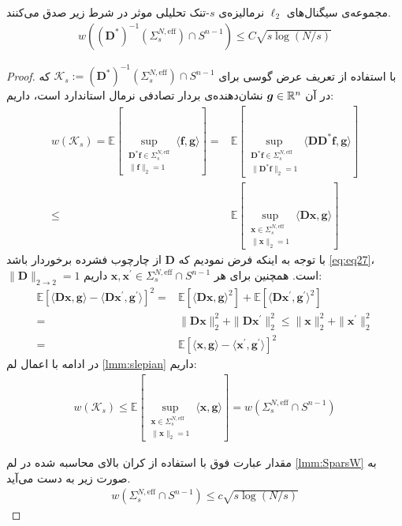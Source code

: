 \begin{lemma}
\label{lmm:PreImW}
مجموعه‌ی سیگنال‌های 
$\ell_2$
نرمالیزه‌ی 
$s$-تنک
تحلیلی موثر در شرط زیر صدق می‌کنند.
\begin{align}
\label{eq:PreImW1}
\mathit{w}\left(\left(\mathbf{D}^{\ast}\right)^{-1}\left(\Sigma_{s}^{N,\text{eff}}\right)\cap S^{n-1} \right)\leq C \sqrt{s \log\left(N/s\right)}
\end{align}
\end{lemma}


\begin{proof}
با استفاده از تعریف عرض گوسی برای
$ \mathcal{K}_{s}:= \left(\mathbf{D}^{\ast}\right)^{-1}\left(\Sigma_{s}^{N,\text{eff}}\right)\cap S^{n-1} $
که در آن 
$ \bm{g}\in \mathbb{R}^{n} $
نشان‌دهنده‌ی  بردار تصادفی نرمال استاندارد است، داریم:
\begin{align*}
\mathit{w}\left(\mathcal{K}_{s}\right)= \mathbb{E}\left[\sup_{\substack{\bm{D}^{\ast}\bm{f}\in \Sigma_{s}^{N,\text{eff}}\\ \|\bm{f}\|_2=1}} \langle\bm{f},\bm{g}\rangle \right] 
=& \mathbb{E}\left[\sup_{\substack{\bm{D}^{\ast}\bm{f}\in \Sigma_{s}^{N,\text{eff}}\\ \|\bm{D}^{\ast}\bm{f}\|_2=1}} \langle\bm{D}\bm{D}^{\ast}\bm{f},\bm{g}\rangle \right] \\
\leq & \mathbb{E}\left[\sup_{\substack{\bm{x}\in \Sigma_{s}^{N,\text{eff}}\\ \|\bm{x}\|_2=1}} \langle\bm{D}\bm{x},\bm{g}\rangle \right] 
\end{align*}
با توجه به اینکه فرض نمودیم که 
$\bm{D}$
از چارچوب فشرده برخوردار باشد
\eqref{eq:eq27}، 
$ \|\bm{D}\|_{2\rightarrow 2} = 1 $
است. همچنین برای هر 
$ \bm{x},\bm{x}^{\prime}\in \Sigma^{N,\text{eff}}_{s} \cap S^{n-1} $
داریم:
\begin{align*}
\mathbb{E}\left[ \langle\bm{D}\bm{x},\bm{g}\rangle - \langle\bm{D}\bm{x}^{\prime},\bm{g}^{\prime}\rangle \right]^{2} =& \mathbb{E}\left[ \langle \bm{Dx},\bm{g} \rangle^{2} \right]+\mathbb{E}\left[ \langle \bm{D}\bm{x}^{\prime},\bm{g}^{\prime} \rangle^{2} \right] \\
=& \|\bm{D}\bm{x}\|_{2}^{2}+\|\bm{D}\bm{x}^{\prime}\|_{2}^{2} 
\leq \|\bm{x}\|^{2}_{2}+\|\bm{x}^{\prime}\|^{2}_{2}\\
=& \mathbb{E}\left[ \langle\bm{x},\bm{g}\rangle - \langle\bm{x}^{\prime},\bm{g}^{\prime}\rangle \right]^{2} 
\end{align*} 
در ادامه با اعمال لم
\eqref{lmm:slepian}
داریم:
\begin{align}
\label{eq:PreImW2}
w\left(\mathcal{K}_{s}\right) \leq  \mathbb{E}\left[\sup_{\substack{\bm{x}\in \Sigma_{s}^{N,\text{eff}}\\ \|\bm{x}\|_2=1}} \langle\bm{x},\bm{g}\rangle \right] =  w \left( \Sigma^{N,\text{eff}}_{s}\cap S^{n-1}\right)
\end{align}

مقدار عبارت فوق با استفاده از کران بالای محاسبه شده در لم
\eqref{lmm:SparsW}
به صورت زیر به دست می‌آید.
\begin{align}
 w \left( \Sigma^{N,\text{eff}}_{s}\cap S^{n-1}\right) \leq c \sqrt{s \log\left(N/s\right)}
\end{align}

\end{proof}

